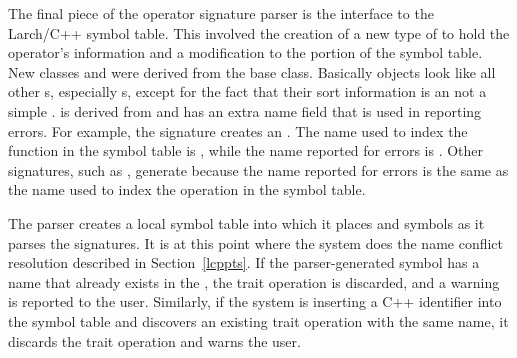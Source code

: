 The final piece of the operator signature parser is the interface to
the Larch/C++ symbol table. This involved the creation of a new type
of  to hold the operator's information and a
modification to the  portion of the symbol
table. New classes  and
 were derived from the 
base class. Basically  objects look
like all other s, especially s, except for the
fact that their sort information is an 
 not a simple . 
is derived from  and has an extra name field that is
used in reporting errors. For example, the signature  creates an
. The name used to index the function in the
symbol table is , while the name reported for
errors is . Other signatures, such as
, generate  because the
name reported for errors is the same as the name used to index the
operation in the symbol table. 

The parser creates a local symbol table into which it places
 and  symbols as it parses
the signatures. It is at this point where the system does the name
conflict resolution described in Section~\ref{lcppts}. If the
parser-generated symbol has a name that already exists in the 
, the trait operation is discarded, and a
warning is reported to the user. Similarly, if the system is inserting a C++
identifier into the symbol table and discovers an existing trait operation
with the same name, it discards the trait operation and warns the user.

